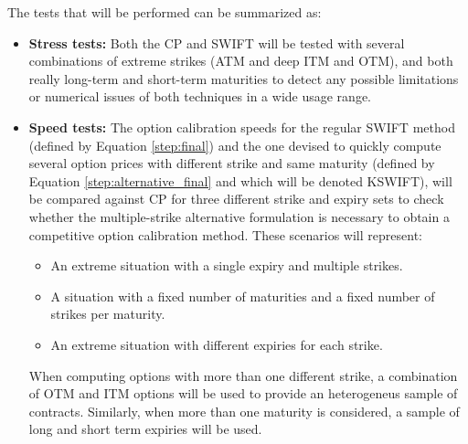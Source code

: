 \documentclass[12,twoside]{mammeTFM}
\theoremstyle{definition}
\theoremstyle{remark}
\begin{document}
The tests that will be performed can be summarized as:
\begin{itemize}

\item \textbf{Stress tests:}
Both the CP and SWIFT will be tested with several combinations of extreme strikes (ATM and deep ITM and OTM), and both really long-term and short-term maturities to detect any possible limitations or numerical issues of both techniques in a wide usage range.

\item \textbf{Speed tests:}
The option calibration speeds for the regular SWIFT method (defined by Equation \ref{step:final}) and the one devised to quickly compute several option prices with different strike and same maturity (defined by Equation \ref{step:alternative_final} and which will be denoted KSWIFT), will be compared against CP for three different strike and expiry sets to check whether the multiple-strike alternative formulation is necessary to obtain a competitive option calibration method. These scenarios will represent:
\begin{itemize}
\item An extreme situation with a single expiry and multiple strikes.
\item A situation with a fixed number of maturities and a fixed number of strikes per maturity.
\item An extreme situation with different expiries for each strike.
\end{itemize}

When computing options with more than one different strike, a combination of OTM and ITM options will be used to provide an heterogeneus sample of contracts. Similarly, when more than one maturity is considered, a sample of long and short term expiries will be used.




\end{itemize}
\end{document}
